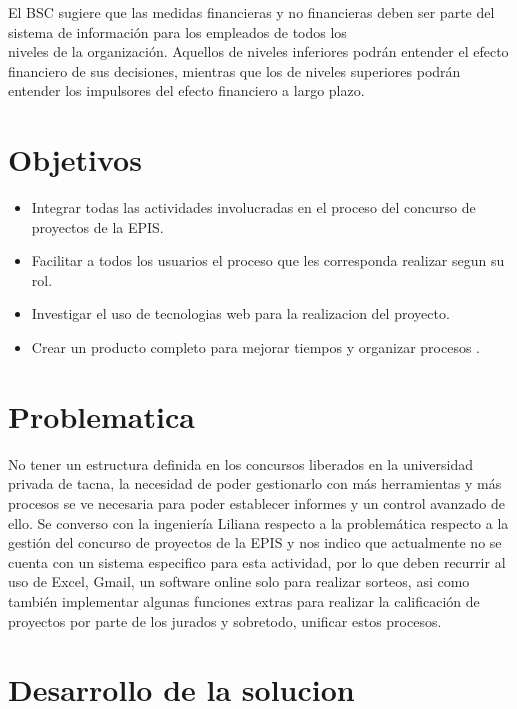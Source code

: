 \documentclass[%
 reprint,
 amsmath,amssymb,
 aps,
]{revtex4-1}
\begin{document}
El BSC sugiere que las medidas financieras y no financieras deben ser parte del sistema de información para los empleados de todos los\\
niveles de la organización. Aquellos de niveles inferiores podrán entender el efecto financiero de sus decisiones, mientras que los de niveles superiores podrán\\
entender los impulsores del efecto financiero a largo plazo.\\


\section {Objetivos}
\begin{itemize}
\item Integrar todas las actividades involucradas en el proceso del concurso de proyectos de la EPIS. \\
\item Facilitar a todos los usuarios el proceso que les corresponda realizar segun su rol. \\
\item Investigar el uso de tecnologias web para la realizacion del proyecto.  \\
\item Crear un producto completo para mejorar tiempos y organizar procesos .\\
\end{itemize}

\section {Problematica}
No tener un estructura definida en los concursos liberados en la universidad privada de tacna, la necesidad de poder gestionarlo con más herramientas y más procesos se ve necesaria para poder establecer informes y un control avanzado de ello. 
Se converso con la ingeniería Liliana respecto a la problemática respecto a la gestión del concurso de proyectos de la EPIS y nos indico que actualmente no se cuenta con un sistema especifico para esta actividad, por lo que deben recurrir al uso de Excel, Gmail, un software online solo para realizar sorteos, asi como también implementar algunas funciones extras para realizar la calificación de proyectos por parte de los jurados y sobretodo, unificar estos procesos.

\section {Desarrollo de la solucion}
\end{document}
